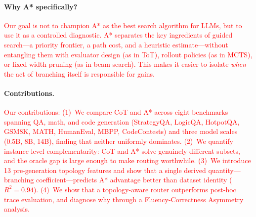 \documentclass[11pt]{article}
\begin{document}


\paragraph{Why A* specifically?}
\textcolor{red}{Our goal is not to champion A* as the best search algorithm for LLMs, but to use it as a controlled diagnostic. A* separates the key ingredients of guided search---a priority frontier, a path cost, and a heuristic estimate---without entangling them with evaluator design (as in ToT), rollout policies (as in MCTS), or fixed-width pruning (as in beam search). This makes it easier to isolate \emph{when} the act of branching itself is responsible for gains.}

\paragraph{Contributions.}
\textcolor{red}{Our contributions: (1)~We compare CoT and A* across eight benchmarks spanning QA, math, and code generation (StrategyQA, LogicQA, HotpotQA, GSM8K, MATH, HumanEval, MBPP, CodeContests) and three model scales (0.5B, 8B, 14B), finding that neither uniformly dominates. (2)~We quantify instance-level complementarity: CoT and A* solve genuinely different subsets, and the oracle gap is large enough to make routing worthwhile. (3)~We introduce 13 pre-generation topology features and show that a single derived quantity---branching coefficient---predicts A* advantage better than dataset identity ($R^2=0.94$). (4)~We show that a topology-aware router outperforms post-hoc trace evaluation, and diagnose why through a Fluency-Correctness Asymmetry analysis.}
\end{document}

